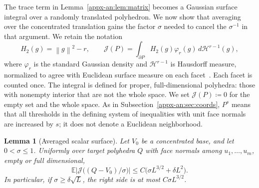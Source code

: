 \documentclass[11pt,letterpaper]{article}
\newtheorem{lemma}{Lemma}
\theoremstyle{remark}
\newcommand{\E}{\mathbb E}
\newcommand{\norm}[1]{\left\lVert#1\right\rVert}
\newcommand{\dd}{\,d}
\newcommand{\surf}{\mathcal J}
\begin{document}
The trace term in Lemma~\ref{appx-an:lem:matrix} becomes a Gaussian
surface integral over a randomly translated polyhedron. We now show
that averaging over the concentrated translation gains the factor
\(\sigma\) needed to cancel the \(\sigma^{-1}\) in that argument.
We retain the notation
\[
 H_2(g)=\norm g^2-r,\qquad
 \surf(P)=\int_{\partial P}H_2(g)\varphi_r(g)\dd\mathcal H^{r-1}(g),
\]
where \(\varphi_r\) is the standard Gaussian density and
\(\mathcal H^{r-1}\) is Hausdorff measure, normalized to agree with
Euclidean surface measure on each facet~\cite[Chapter~2]{EvansGariepy2015}.
Each facet is counted once. The integral is defined for proper, full-dimensional
polyhedra: those with nonempty interior that are not the whole space.
We set \(\surf(P)\coloneqq 0\) for the empty set and the whole space. As in
Subsection~\ref{appx-an:sec:coords}, \(P^s\) means that all thresholds
in the defining system of inequalities with unit face normals are increased by
\(s\); it does not denote a Euclidean neighborhood.

\begin{lemma}[Averaged scalar surface]\label{appx-an:lem:surface}
Let \(V_0\) be a concentrated base, and let \(0<\sigma\le1\). Uniformly
over target polyhedra \(Q\) with face normals among \(u_1,\ldots,u_m\), empty
or full dimensional,
\begin{equation}
 \E\left|\surf\bigl((Q-V_0)/\sigma\bigr)\right|
 \le C\bigl(\sigma L^{3/2}+\delta L^2\bigr).
 \label{appx-an:surface-bound}
\end{equation}
In particular, if \(\sigma\ge\delta\sqrt L\), the right side is at most
\(C\sigma L^{3/2}\).
\end{lemma}
\end{document}
